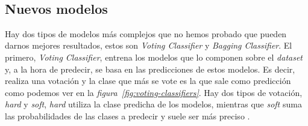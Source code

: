 \begin{table}[!ht]
    \centering
    \caption{Resultados de entrenar los modelos básicos habiendo balanceado el \textit{dataset}. Fuente propia.}\ \label{tab:balanced-basic-training}
\end{table}

\clearpage
\subsection{Nuevos modelos}

Hay dos tipos de modelos más complejos que no hemos probado que pueden darnos mejores resultados, estos son \textit{Voting Classifier} y \textit{Bagging Classifier}. El primero, \textit{Voting Classifier}, entrena los modelos que lo componen sobre el \textit{dataset} y, a la hora de predecir, se basa en las predicciones de estos modelos. Es decir, realiza una votación y la clase que más se vote es la que sale como predicción como podemos ver en la \textit{figura\ \ref{fig:voting-classifiers}}. Hay dos tipos de votación, \textit{hard} y \textit{soft}, \textit{hard} utiliza la clase predicha de los modelos, mientras que \textit{soft} suma las probabilidades de las clases a predecir y suele ser más preciso \cite{Ensemble96:online}. 

